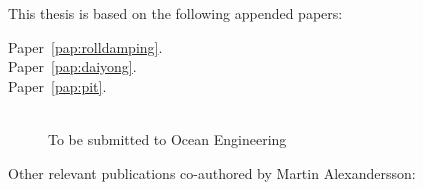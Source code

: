 
\begin{refsection}

This thesis is based on the following appended papers:

\begin{description}
\item[Paper~\ref{pap:rolldamping}.]


\item[Paper~\ref{pap:daiyong}.] 

\item[Paper~\ref{pap:pit}.] 
\\
To be submitted to Ocean Engineering

\end{description}

\vspace{1cm}

\noindent Other relevant publications co-authored by Martin Alexandersson:
\begin{description}
\normalsize
\newcommand{\ME}{{\bfseries Martin Alexandersson}}

\item
{}

\item
{}

\item
{}

\end{description}

\end{refsection}
